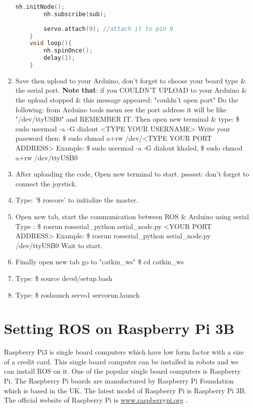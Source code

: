 \begin{enumerate}
\begin{lstlisting}[language=CPP]
 		nh.initNode();
 		nh.subscribe(sub);
 		
 		servo.attach(9); //attach it to pin 9
 	}
 	void loop(){
 		nh.spinOnce();
 		delay(1);
 	}
 	\end{lstlisting}
 	\item Save then upload to your Arduino, don't forget to choose your board type \& the serial port.
 	\textbf{Note that}: if you COULDN'T UPLOAD to your Arduino \& the upload stopped \& this message appeared: "couldn't open port" Do the following:
 	from Arduino tools menu see the port address it will be like "/dev/ttyUSB0" and REMEMBER IT. Then open new terminal \& type: \$ sudo usermod -a -G dialout <TYPE YOUR USERNAME>
 	Write your password then: \$ sudo chmod a+rw /dev/<TYPE YOUR PORT ADDRESS>
 	Example: \$ sudo usermod -a -G dialout khaled, \$ sudo chmod a+rw /dev/ttyUSB0
 	\item After uploading the code, Open new terminal to start. pssssst: don't forget to connect the joystick.
 	\item Type: '\$ roscore' to initialize the master.
 	\item Open new tab, start the communication between ROS \& Arduino using serial Type : \$ rosrun rosserial\_python serial\_node.py <YOUR PORT ADDRESS>
 	Example: \$ rosrun rosserial\_python serial\_node.py /dev/ttyUSB0
 	Wait to start.
 	\item Finally open new tab go to "catkin_ws" \$ cd catkin\_ws
 	\item Type: \$ source devel/setup.bash
 	\item Type: \$ roslaunch servo1 servorun.launch
 \end{enumerate}


\section{Setting ROS on Raspberry Pi 3B}

Raspberry Pi3 is single board computers which have low form factor with a size of a credit card. This single board computer can be installed in robots and we can install ROS on it.
One of the popular single board computers is Raspberry Pi. The Raspberry Pi boards are manufactured by Raspberry Pi Foundation which is based in the UK. The latest model of Raspberry Pi is Raspberry Pi 3B. The official website of Raspberry Pi is \url{www.raspberrypi.org} .

